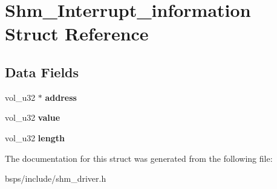 \hypertarget{structShm__Interrupt__information}{}\section{Shm\+\_\+\+Interrupt\+\_\+information Struct Reference}
\label{structShm__Interrupt__information}
\subsection*{Data Fields}
\begin{DoxyCompactItemize}
\item 
\mbox{\label{structShm__Interrupt__information_a14126af3adb36b5c59d43c49294466d8}} 
vol\+\_\+u32 $\ast$ {\bfseries address}
\item 
\mbox{\label{structShm__Interrupt__information_a203b060d310efb9b8d0ed6db4afe83d7}} 
vol\+\_\+u32 {\bfseries value}
\item 
\mbox{\label{structShm__Interrupt__information_a21785d1e5ae19388d04f879d5324ce30}} 
vol\+\_\+u32 {\bfseries length}
\end{DoxyCompactItemize}


The documentation for this struct was generated from the following file\+:\begin{DoxyCompactItemize}
\item 
bsps/include/shm\+\_\+driver.\+h\end{DoxyCompactItemize}
